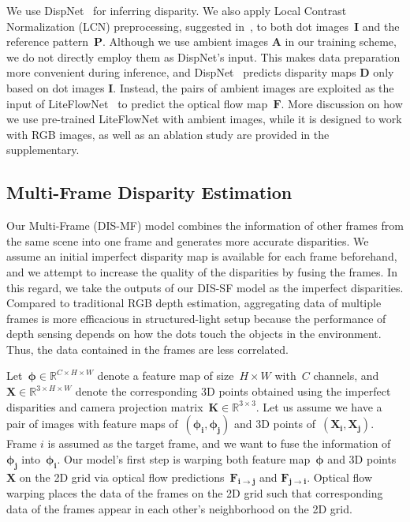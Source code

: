 We use DispNet~\citep{mayer2016large} for inferring disparity. We also apply Local Contrast Normalization (LCN) preprocessing, suggested in~\cite{zhang2018activestereonet, riegler2019connecting}, to both dot images~$\boldsymbol{I}$ and the reference pattern~$\boldsymbol{P}$. Although we use ambient images $\boldsymbol{A}$ in our training scheme, we do not directly employ them as DispNet's input. This makes data preparation more convenient during inference, and DispNet~\cite{mayer2016large} predicts disparity maps $\boldsymbol{D}$ only based on dot images $\boldsymbol{I}$. Instead, the pairs of ambient images are exploited as the input of LiteFlowNet~\cite{hui2018liteflownet} to predict the optical flow map~$\boldsymbol{F}$. More discussion on how we use pre-trained LiteFlowNet with ambient images, while it is designed to work with RGB images, as well as an ablation study are provided in the supplementary.

\subsection{Multi-Frame Disparity Estimation} \label{sec:c2_muti-frame}

Our Multi-Frame (DIS-MF) model combines the information of other frames from the same scene into one frame and generates more accurate disparities. We assume an initial imperfect disparity map is available for each frame beforehand, and we attempt to increase the quality of the disparities by fusing the frames. In this regard, we take the outputs of our DIS-SF model as the imperfect disparities. Compared to traditional RGB depth estimation, aggregating data of multiple frames is more efficacious in structured-light setup because the performance of depth sensing depends on how the dots touch the objects in the environment. Thus, the data contained in the frames are less correlated.

Let~$\boldsymbol{\phi} \in \mathbb{R}^{C \times H \times W}$ denote a feature map of size~$H \times W$ with~$C$ channels, and~$\boldsymbol{X} \in \mathbb{R}^{3 \times H \times W}$ denote the corresponding 3D points obtained using the imperfect disparities and camera projection matrix~$\boldsymbol{K} \in \mathbb{R}^{3 \times 3}$. Let us assume we have a pair of images with feature maps of~$(\boldsymbol{\phi_i},\boldsymbol{\phi_j})$ and 3D points of~$(\boldsymbol{X_i},\boldsymbol{X_j})$. Frame $i$ is assumed as the target frame, and we want to fuse the information of~$\boldsymbol{\phi_j}$ into~$\boldsymbol{\phi_i}$. Our model's first step is warping both feature map~$\boldsymbol{\phi}$ and 3D points~$\boldsymbol{X}$ on the 2D grid via optical flow predictions~$\boldsymbol{F_{i \rightarrow j}}$ and $\boldsymbol{F_{j \rightarrow i}}$. Optical flow warping places the data of the frames on the 2D grid such that corresponding data of the frames appear in each other's neighborhood on the 2D grid.

